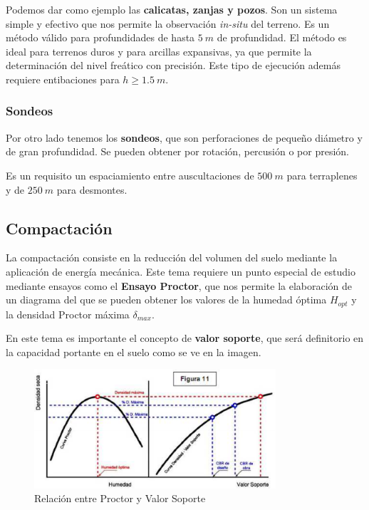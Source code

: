 \documentclass[../main.tex]{subfiles}
\begin{document}
Podemos dar como ejemplo las \textbf{calicatas, zanjas y pozos}. Son un sistema
simple y efectivo que nos permite la observación \textit{in-situ} del terreno.
Es un método válido para profundidades de hasta $\SI{5}{m}$ de profundidad. El
método es ideal para terrenos duros y para arcillas expansivas, ya que permite
la determinación del nivel freático con precisión.
Este tipo de ejecución además requiere entibaciones para $h \geq \SI{1.5}{m}$.

\subsubsection{Sondeos}

Por otro lado tenemos los \textbf{sondeos}, que son perforaciones de pequeño
diámetro y de gran profundidad. Se pueden obtener por rotación, percusión o 
por presión.

Es un requisito un espaciamiento entre auscultaciones de $\SI{500}{m}$ para 
terraplenes y de $\SI{250}{m}$ para desmontes.

\subsection{Compactación}

La compactación consiste en la reducción del volumen del suelo mediante la aplicación
de energía mecánica. Este tema requiere un punto especial de estudio mediante
ensayos como el \textbf{Ensayo Proctor}, que nos permite la elaboración de un
diagrama del que se pueden obtener los valores de la humedad óptima $H_{opt}$
 y la densidad Proctor máxima $\delta_{max}$.

En este tema es importante el concepto de \textbf{valor soporte},
que será definitorio en la capacidad portante en el suelo como se ve en la 
imagen.

\begin{figure}[ht]
  \centering
  \includegraphics[width=0.8\textwidth]{../images/20210422/valor_soporte}
  \caption{Relación entre Proctor y Valor Soporte}
  \label{fig:valor_soporte}
\end{figure}
\end{document}
